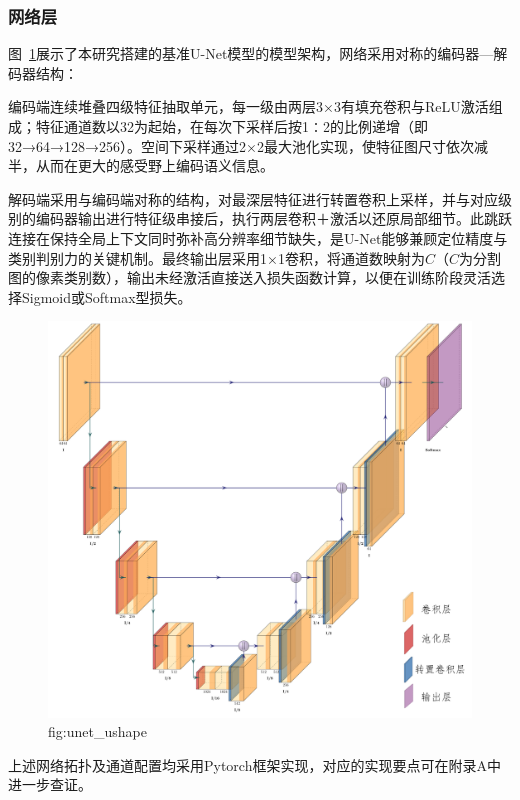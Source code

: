 \subsubsection{网络层}

图~\ref{fig:unet_ushape}展示了本研究搭建的基准U-Net模型的模型架构，网络采用对称的编码器—解码器结构：

编码端连续堆叠四级特征抽取单元，每一级由两层3×3有填充卷积与ReLU激活组成；特征通道数以32为起始，在每次下采样后按1∶2的比例递增（即32→64→128→256）。空间下采样通过2×2最大池化实现，使特征图尺寸依次减半，从而在更大的感受野上编码语义信息。

解码端采用与编码端对称的结构，对最深层特征进行转置卷积上采样，并与对应级别的编码器输出进行特征级串接后，执行两层卷积＋激活以还原局部细节。此跳跃连接在保持全局上下文同时弥补高分辨率细节缺失，是U-Net能够兼顾定位精度与类别判别力的关键机制。最终输出层采用1×1卷积，将通道数映射为$C$（$C$为分割图的像素类别数），输出未经激活直接送入损失函数计算，以便在训练阶段灵活选择Sigmoid或Softmax型损失。

\begin{figure}
    \centering
    \includegraphics[width=\textwidth]{fig/Unet_ushape.png}
    \caption{fig:unet_ushape}
    \label{fig:unet_ushape}
\end{figure}

上述网络拓扑及通道配置均采用Pytorch框架实现，对应的实现要点可在附录A中进一步查证。

